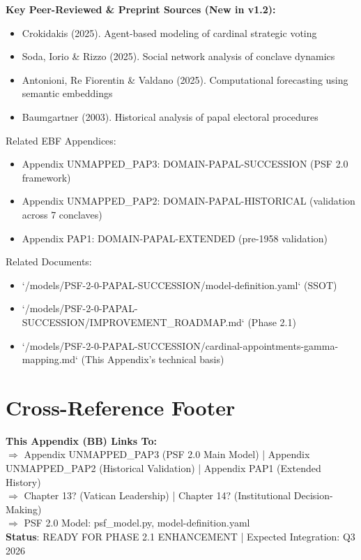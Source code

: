 \noindent
\textbf{Key Peer-Reviewed & Preprint Sources (New in v1.2):}
\begin{itemize}
\item \nocite{crokidakis2025conclave} Crokidakis (2025). Agent-based modeling of cardinal strategic voting
\item \nocite{soda2025network} Soda, Iorio \& Rizzo (2025). Social network analysis of conclave dynamics
\item \nocite{antonioni2025totopapa} Antonioni, Re Fiorentin \& Valdano (2025). Computational forecasting using semantic embeddings
\item \nocite{baumgartner2003locked} Baumgartner (2003). Historical analysis of papal electoral procedures
\end{itemize}

\noindent
Related EBF Appendices:
\begin{itemize}
\item Appendix UNMAPPED_PAP3: DOMAIN-PAPAL-SUCCESSION (PSF 2.0 framework)
\item Appendix UNMAPPED_PAP2: DOMAIN-PAPAL-HISTORICAL (validation across 7 conclaves)
\item Appendix PAP1: DOMAIN-PAPAL-EXTENDED (pre-1958 validation)
\end{itemize}

\noindent
Related Documents:
\begin{itemize}
\item `/models/PSF-2-0-PAPAL-SUCCESSION/model-definition.yaml` (SSOT)
\item `/models/PSF-2-0-PAPAL-SUCCESSION/IMPROVEMENT_ROADMAP.md` (Phase 2.1)
\item `/models/PSF-2-0-PAPAL-SUCCESSION/cardinal-appointments-gamma-mapping.md` (This Appendix's technical basis)
\end{itemize}

\section*{Cross-Reference Footer}

\begin{center}
\colorbox{yellow!20}{\begin{minipage}{0.95\textwidth}
\small
\textbf{This Appendix (BB) Links To:} \\
$\Rightarrow$ Appendix UNMAPPED_PAP3 (PSF 2.0 Main Model) | Appendix UNMAPPED_PAP2 (Historical Validation) | Appendix PAP1 (Extended History) \\
$\Rightarrow$ Chapter 13? (Vatican Leadership) | Chapter 14? (Institutional Decision-Making) \\
$\Rightarrow$ PSF 2.0 Model: psf\_model.py, model-definition.yaml \\
\textbf{Status}: READY FOR PHASE 2.1 ENHANCEMENT | Expected Integration: Q3 2026
\end{minipage}}
\end{center}


